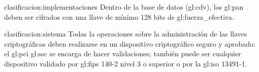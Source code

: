 {clasificacion:implementaciones}
{
  Dentro de la base de datos (\gls{gl:cdv}), los \gls{gl:pan} deben ser
  cifrados con una llave de mínimo 128 bits de \gls{gl:fuerza_efectiva}.
}

{clasificacion:sistema}
{
  Todas la operaciones sobre la administración de las llaves criptográficas
  deben realizarse en un dispositivo criptográfico seguro y aprobado: el
  \gls{gl:pci} \gls{gl:ssc} se encarga de hacer validaciones; también puede ser
  cualquier dispositivo validado por \gls{gl:fips} 140-2 nivel 3 o superior
  \cite{nist_modulos_criptograficos} o por la \gls{gl:iso} 13491-1.
}

